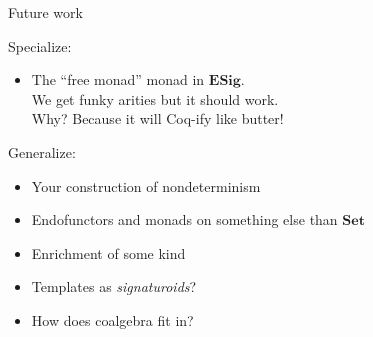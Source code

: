 \documentclass{beamer}
\begin{document}
\begin{frame}{Future work} %

  Specialize:
  \begin{itemize}
    \item
      The ``free monad'' monad in $\mathbf{ESig}$. \\
      We get funky arities but it should work. \\
      Why? Because it will Coq-ify like butter!
  \end{itemize}

  Generalize:
  \begin{itemize}
    \item Your construction of nondeterminism
    \item Endofunctors and monads on something else than $\mathbf{Set}$
    \item Enrichment of some kind
    \item Templates as \emph{signaturoids}?
    \item How does coalgebra fit in?
  \end{itemize}

\end{frame}
\end{document}

